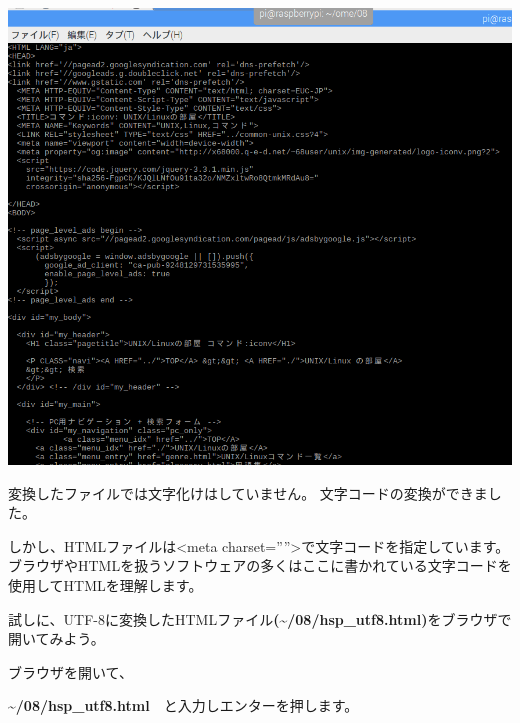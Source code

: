 \documentclass[a4paper,12pt,dvipdfmx]{jarticle}
\begin{document}
\begin{center}
\includegraphics[width=17.006cm]{textbook-img023.png}

\end{center}
変換したファイルでは文字化けはしていません。
文字コードの変換ができました。

\clearpage
しかし、HTMLファイルは{\textless}meta
charset=””{\textgreater}で文字コードを指定しています。
ブラウザやHTMLを扱うソフトウェアの多くはここに書かれている文字コードを使用してHTMLを理解します。

試しに、UTF-8に変換したHTMLファイル\textbf{({\textasciitilde}/08/hsp\_utf8.html)}をブラウザで開いてみよう。

ブラウザを開いて、

\textbf{{\textasciitilde}/08/hsp\_utf8.html}　と入力しエンターを押します。
\end{document}
